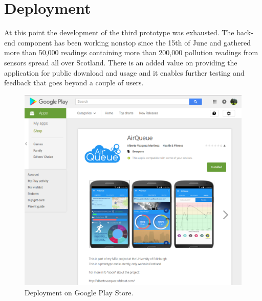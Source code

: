 \section{Deployment}
At this point the development of the third prototype was exhausted. The back-end component has been working nonstop since the 15th of June and gathered more than 50,000 readings containing more than 200,000 pollution readings from sensors spread all over Scotland. There is an added value on providing the application for public download and usage and it enables further testing and feedback that goes beyond a couple of users.

\begin{figure}[H]
\begin{adjustbox}{width=.6\textwidth,center=\textwidth}
  \centering
  \includegraphics[scale=1]{images/play_store.png}
\end{adjustbox}
  \caption[Deployment on Google Play Store]{Deployment on Google Play Store.\footnotemark}
  \label{fig:deployment_play_store}
\end{figure}

